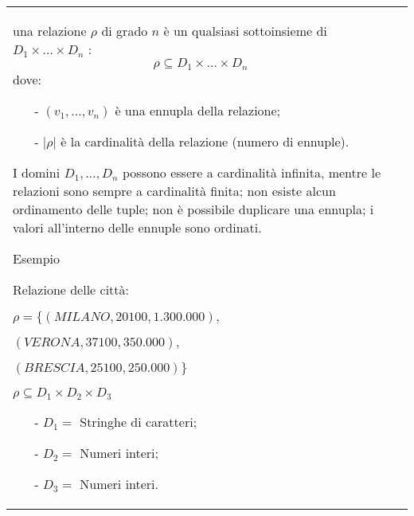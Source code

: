 \documentclass[a4paper, 10pt]{report}
\begin{document}
\begin{longtable}{| p{} | p{} |}
			una relazione $\rho$ di grado $n$ è un qualsiasi sottoinsieme di 
			$D_1 \times \dots \times D_n$ :
			\[
				\rho \subseteq D_1 \times \dots \times D_n
			\]
			dove:
			\begin{itemize}
				\item[-] $(v_1, \dots, v_n)$ è una ennupla della relazione;
				\item[-] $|\rho|$ è la cardinalità della relazione (numero di ennuple).
			\end{itemize}

I domini $D_1, \dots , D_n$ possono essere a cardinalità infinita, mentre le relazioni sono sempre a cardinalità finita; non esiste alcun ordinamento delle tuple; non è possibile duplicare una ennupla; i valori all'interno delle ennuple sono ordinati.

\medskip

Esempio

\medskip

Relazione delle città:
\begin{center}
$\rho = \{(MILANO, 20100, 1.300.000),	$
	
$(VERONA, 37100, 350.000),$

$(BRESCIA, 25100, 250.000) \}$	
	
$\rho \subseteq D_1 \times D_2 \times D_3$
	
		\begin{itemize}
			\item[-] $D_1 =$ Stringhe di caratteri;
			\item[-] $D_2 =$ Numeri interi;
			\item[-] $D_3 =$ Numeri interi.
		\end{itemize}
\end{center}
\end{longtable}
\end{document}
